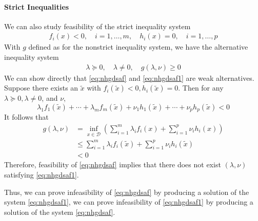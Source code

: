 \documentclass{article}
\begin{document}
\paragraph{Strict Inequalities}
We can also study feasibility of the strict inequality system
\begin{align}
f_{i}(x)<0, \quad i=1, \ldots, m, \quad h_{i}(x)=0, \quad i=1, \ldots, p\label{eq:nhgdsaf}
\end{align}
With $g$ defined as for the nonstrict inequality system, we have the alternative inequality system
\begin{align}
\lambda \succeq 0, \quad \lambda \neq 0, \quad g(\lambda, \nu) \geq 0\label{eq:nhgdsaf1}
\end{align}
We can show directly that \cref{eq:nhgdsaf} and \cref{eq:nhgdsaf1} are weak alternatives. Suppose there exists an $\tilde{x}$ with $f_{i}(\tilde{x})<0, h_{i}(\tilde{x})=0$. Then for any $\lambda \succeq 0, \lambda \neq 0$, and $\nu$,
$$
\lambda_{1} f_{1}(\tilde{x})+\cdots+\lambda_{m} f_{m}(\tilde{x})+\nu_{1} h_{1}(\tilde{x})+\cdots+\nu_{p} h_{p}(\tilde{x})<0
$$
It follows that
$$
\begin{aligned}
g(\lambda, \nu) &=\inf _{x \in \mathcal{D}}\left(\sum_{i=1}^{m} \lambda_{i} f_{i}(x)+\sum_{i=1}^{p} \nu_{i} h_{i}(x)\right) \\
& \leq \sum_{i=1}^{m} \lambda_{i} f_{i}(\tilde{x})+\sum_{i=1}^{p} \nu_{i} h_{i}(\tilde{x}) \\
&<0
\end{aligned}
$$
Therefore, feasibility of \cref{eq:nhgdsaf} implies that there does not exist $(\lambda, \nu)$ satisfying \cref{eq:nhgdsaf1}.

Thus, we can prove infeasibility of \cref{eq:nhgdsaf} by producing a solution of the system \cref{eq:nhgdsaf1}, we can prove infeasibility of \cref{eq:nhgdsaf1} by producing a solution of the system \cref{eq:nhgdsaf}.
\end{document}
